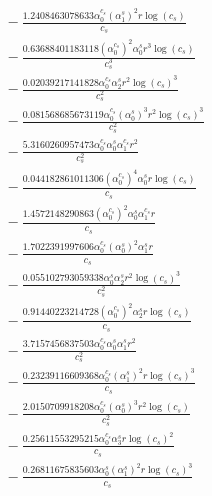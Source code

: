 \documentclass[10pt]{article}
\begin{document}
\begin{align*}
&{}  - \frac{1.2408463078633 \alpha_{0}^{c_s} \left(\alpha_{1}^s\right)^{2} r \log{\left(c_{s} \right)}}{c_{s}} \\
&{}  - \frac{0.63688401183118 \left(\alpha_{0}^{c_s}\right)^{2} \alpha_{0}^s r^{3} \log{\left(c_{s} \right)}}{c_{s}^{3}} \\
&{}  - \frac{0.02039217141828 \alpha_{0}^{c_s} \alpha_{2}^s r^{2} \log{\left(c_{s} \right)}^{3}}{c_{s}^{2}} \\
&{}  - \frac{0.081568685673119 \alpha_{0}^{c_s} \left(\alpha_{0}^s\right)^{3} r^{2} \log{\left(c_{s} \right)}^{3}}{c_{s}^{2}} \\
&{}  - \frac{5.3160260957473 \alpha_{0}^{c_s} \alpha_{0}^s \alpha_{1}^{c_s} r^{2}}{c_{s}^{2}} \\
&{}  - \frac{0.044182861011306 \left(\alpha_{0}^{c_s}\right)^{4} \alpha_{0}^s r \log{\left(c_{s} \right)}}{c_{s}} \\
&{}  - \frac{1.4572148290863 \left(\alpha_{0}^{c_s}\right)^{2} \alpha_{0}^s \alpha_{1}^{c_s} r}{c_{s}} \\
&{}  - \frac{1.7022391997606 \alpha_{0}^{c_s} \left(\alpha_{0}^s\right)^{2} \alpha_{1}^s r}{c_{s}} \\
&{}  - \frac{0.055102793059338 \alpha_{0}^s \alpha_{2}^s r^{2} \log{\left(c_{s} \right)}^{3}}{c_{s}^{2}} \\
&{}  - \frac{0.91440223214728 \left(\alpha_{0}^{c_s}\right)^{2} \alpha_{2}^s r \log{\left(c_{s} \right)}}{c_{s}} \\
&{}  - \frac{3.7157456837503 \alpha_{0}^{c_s} \alpha_{0}^s \alpha_{1}^s r^{2}}{c_{s}^{2}} \\
&{}  - \frac{0.23239116609368 \alpha_{0}^{c_s} \left(\alpha_{1}^s\right)^{2} r \log{\left(c_{s} \right)}^{3}}{c_{s}} \\
&{}  - \frac{2.0150709918208 \alpha_{0}^{c_s} \left(\alpha_{0}^s\right)^{3} r^{2} \log{\left(c_{s} \right)}}{c_{s}^{2}} \\
&{}  - \frac{0.25611553295215 \alpha_{0}^{c_s} \alpha_{3}^s r \log{\left(c_{s} \right)}^{2}}{c_{s}} \\
&{}  - \frac{0.26811675835603 \alpha_{0}^s \left(\alpha_{1}^s\right)^{2} r \log{\left(c_{s} \right)}^{3}}{c_{s}}
\end{align*}
\end{document}
